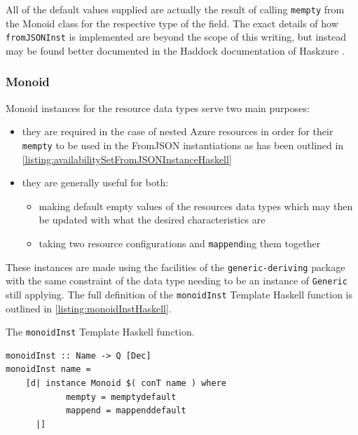 \documentclass[11pt]{report}
\begin{document}
All of the default values supplied are actually the result of calling
\texttt{mempty} from the Monoid class for the respective type of the
field. The exact details of how \texttt{fromJSONInst} is implemented are beyond
the scope of this writing, but instead may be found better documented in the
Haddock documentation of Haskzure \cite{haskzureHaddocks}.

\subsubsection{Monoid}

Monoid instances for the resource data types serve two main purposes:

\begin{itemize}
    \item{} they are required in the case of nested Azure resources in order
        for their \texttt{mempty} to be used in the FromJSON instantiations as
        has been outlined in
        \autoref{listing:availabilitySetFromJSONInstanceHaskell}
    \item{} they are generally useful for both: \begin{itemize}
        \item{} making default empty values of the resources data types which
            may then be updated with what the desired characteristics are
        \item{} taking two resource configurations and \texttt{mappend}ing them
            together
    \end{itemize}
\end{itemize}

These instances are made using the facilities of the \texttt{generic-deriving}
\cite{packageGenericDeriving} package with the same constraint of the data type
needing to be an instance of \texttt{Generic} still applying. The full
definition of the \texttt{monoidInst} Template Haskell function is outlined
in \autoref{listing:monoidInstHaskell}.

\begin{listing}[H]
\caption{The \texttt{monoidInst} Template Haskell function.}
\label{listing:monoidInstHaskell}
\begin{verbatim}
monoidInst :: Name -> Q [Dec]
monoidInst name =
    [d| instance Monoid $( conT name ) where
            mempty = memptydefault
            mappend = mappenddefault
      |]
\end{verbatim}
\end{listing}
\end{document}
